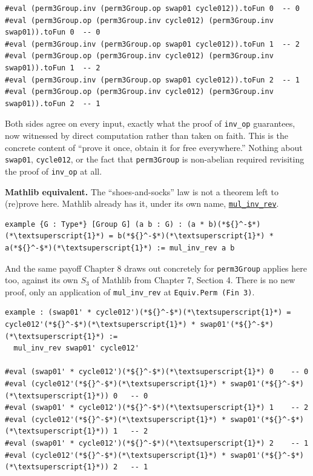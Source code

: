 \begin{lstlisting}
#eval (perm3Group.inv (perm3Group.op swap01 cycle012)).toFun 0  -- 0
#eval (perm3Group.op (perm3Group.inv cycle012) (perm3Group.inv swap01)).toFun 0  -- 0
#eval (perm3Group.inv (perm3Group.op swap01 cycle012)).toFun 1  -- 2
#eval (perm3Group.op (perm3Group.inv cycle012) (perm3Group.inv swap01)).toFun 1  -- 2
#eval (perm3Group.inv (perm3Group.op swap01 cycle012)).toFun 2  -- 1
#eval (perm3Group.op (perm3Group.inv cycle012) (perm3Group.inv swap01)).toFun 2  -- 1
\end{lstlisting}

Both sides agree on every input, exactly what the proof of \texttt{inv\_\allowbreak{}op} guarantees, now witnessed by direct computation rather than taken on faith. This is the concrete content of ``prove it once, obtain it for free everywhere.'' Nothing about \texttt{swap01}, \texttt{cycle012}, or the fact that \texttt{perm3Group} is non-abelian required revisiting the proof of \texttt{inv\_\allowbreak{}op} at all.

\textbf{Mathlib equivalent.} The ``shoes-and-socks'' law is not a theorem left to (re)prove here. Mathlib already has it, under its own name, \href{https://loogle.lean-lang.org/?q=mul_inv_rev}{\texttt{mul\_\allowbreak{}inv\_\allowbreak{}rev}}.

\begin{lstlisting}
example {G : Type*} [Group G] (a b : G) : (a * b)(*${}^-$*)(*\textsuperscript{1}*) = b(*${}^-$*)(*\textsuperscript{1}*) * a(*${}^-$*)(*\textsuperscript{1}*) := mul_inv_rev a b
\end{lstlisting}

And the same payoff Chapter 8 draws out concretely for \texttt{perm3Group} applies here too, against its own \(S_3\) of Mathlib from Chapter 7, Section 4. There is no new proof, only an application of \texttt{mul\_\allowbreak{}inv\_\allowbreak{}rev} at \texttt{Equiv.Perm (Fin 3)}.

\begin{lstlisting}
example : (swap01' * cycle012')(*${}^-$*)(*\textsuperscript{1}*) = cycle012'(*${}^-$*)(*\textsuperscript{1}*) * swap01'(*${}^-$*)(*\textsuperscript{1}*) :=
  mul_inv_rev swap01' cycle012'

#eval (swap01' * cycle012')(*${}^-$*)(*\textsuperscript{1}*) 0    -- 0
#eval (cycle012'(*${}^-$*)(*\textsuperscript{1}*) * swap01'(*${}^-$*)(*\textsuperscript{1}*)) 0   -- 0
#eval (swap01' * cycle012')(*${}^-$*)(*\textsuperscript{1}*) 1    -- 2
#eval (cycle012'(*${}^-$*)(*\textsuperscript{1}*) * swap01'(*${}^-$*)(*\textsuperscript{1}*)) 1   -- 2
#eval (swap01' * cycle012')(*${}^-$*)(*\textsuperscript{1}*) 2    -- 1
#eval (cycle012'(*${}^-$*)(*\textsuperscript{1}*) * swap01'(*${}^-$*)(*\textsuperscript{1}*)) 2   -- 1
\end{lstlisting}


